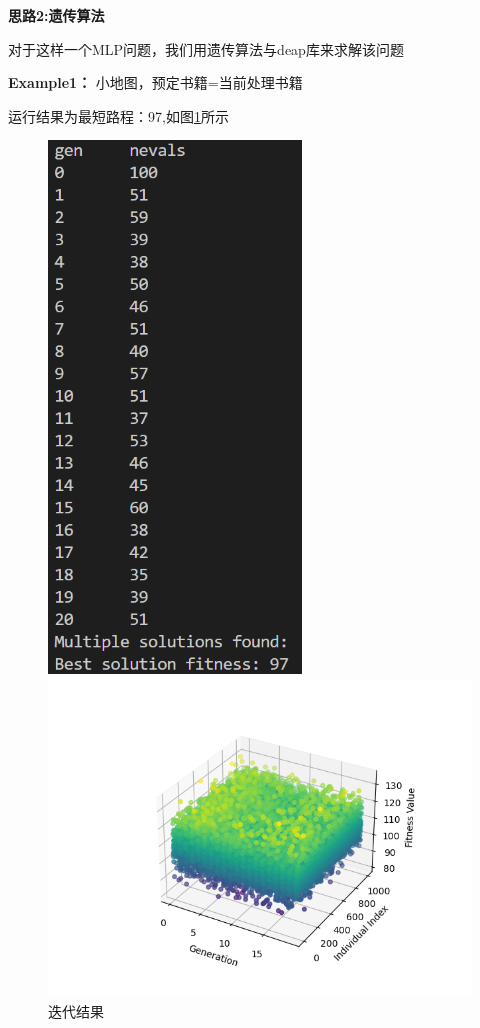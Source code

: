 \documentclass[withoutpreface,bwprint]{thesis-config}
\begin{document}
\newpage
\par \textbf{思路2:遗传算法}
\par 对于这样一个MLP问题，我们用遗传算法与deap库来求解该问题
\par \textbf{Example1：} 小地图，预定书籍=当前处理书籍
\par 运行结果为最短路程：97,如图\ref{d}所示
    \begin{figure}[!htbp]
        \centering
        \begin{minipage}[b]{0.3\linewidth}
            \centering
            \includegraphics[width=0.6\textwidth]{figures/3.1.png}
            \caption{迭代结果}
            \label{d}
        \end{minipage}%
        \begin{minipage}[b]{0.7\linewidth}
            \centering
            \includegraphics[width=1\textwidth]{figures/3.1.1.png}

\end{minipage}
\end{figure}
\end{document}
